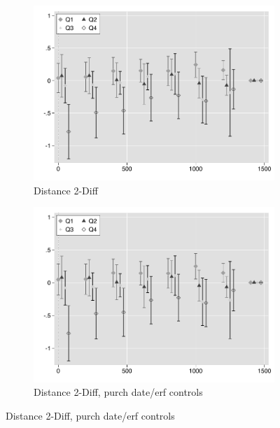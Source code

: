 \documentclass[12pt]{article}
\begin{document}
\begin{figure}
\begin{subfigure}[b]{0.48\textwidth}
        \end{subfigure}
        \begin{subfigure}[b]{0.48\textwidth}
                    \caption[Network2]%
            {{\footnotesize Distance 2-Diff}}    
            \label{fig:prefor}
            \centering
            \includegraphics[width=\textwidth,trim={0.3cm .3cm 0.1cm 0cm}, clip=true]{figures/price_dist_2d_no_ctrl_q}
        \end{subfigure}
        \hfill
        \begin{subfigure}[b]{0.48\textwidth}
                    \caption[Network2]%
            {{\footnotesize Distance 2-Diff, purch date/erf controls}}    
            \label{fig:prefor}
            \centering
            \includegraphics[width=\textwidth,trim={0.3cm .3cm 0.1cm 0cm}, clip=true]{figures/price_dist_2d_ctrl_q}
        \end{subfigure}
       
\end{figure}
\end{document}
